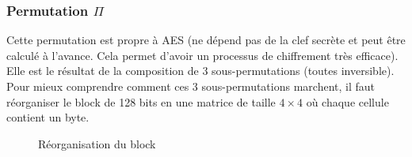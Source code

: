 \documentclass[a4paper, 12pt]{article}
\begin{document}
\subsubsection{Permutation $\Pi$}
Cette permutation est propre à AES (ne dépend pas de la clef secrète et peut être calculé à l'avance. Cela permet d'avoir un processus de chiffrement très efficace). Elle est le résultat de la composition de 3 sous-permutations (toutes inversible). Pour mieux comprendre comment ces 3 sous-permutations marchent, il faut réorganiser le block de 128 bits en une matrice de taille $4\times4$ où chaque cellule contient un byte.

\begin{figure}[h]
\centering
{}
\caption{Réorganisation du block}
\label{reorg_entre}
\end{figure}
\end{document}

